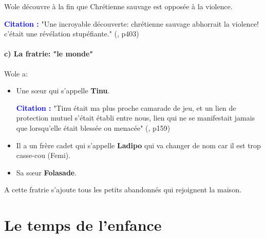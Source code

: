 \documentclass[a4paper, 11pt, hidelinks]{article}
\newcommand{\bs}{\bigskip}
\newcommand{\cit}{\large \textcolor{blue}{\textbf{Citation :}} \large }
\newcommand{\rb}[1]{\Romanbar{#1}}
\begin{document}
Wole découvre à la fin que Chrétienne sauvage est opposée à la violence.

\cit "Une incroyable découverte: chrétienne sauvage abhorrait la violence! c'était une révélation stupéfiante." (\rb{14}, p403)




\paragraph{c) La fratrie: "le monde"}


Wole a:

\begin{itemize}
    \item Une s\oe ur qui s'appelle \textbf{Tinu}.
\bs

    \cit "Tinu était ma plus proche camarade de jeu, et un lien de protection mutuel s'était établi entre nous, lien qui ne se manifestait jamais que 
    lorsqu'elle était blessée ou menacée" (\rb{6}, p159)
\bs

    \item Il a un frère cadet qui s'appelle \textbf{Ladipo} qui va changer de nom car il est trop casse-cou (Femi).
    \item Sa s\oe ur \textbf{Folasade}.
\end{itemize}


\bs
A cette fratrie s'ajoute tous les petits abandonnés qui rejoignent la maison.






\section{Le temps de l'enfance}
\end{document}
